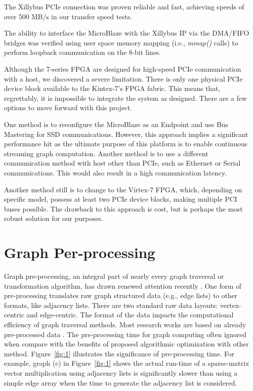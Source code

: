 The Xillybus PCIe connection was proven reliable and fast, achieving speeds of over 500 MB/s in our transfer speed tests.

The ability to interface the MicroBlaze with the Xillybus IP via the DMA/FIFO bridges was verified using user space memory mapping (i.e., \emph{mmap()} calls) to perform loopback communication on the 8-bit lines.

Although the 7-series FPGA are designed for high-speed PCIe communication with a host, we discovered a severe limitation.  There is only one physical PCIe device block available to the Kintex-7's FPGA fabric.  This means that, regrettably, it is impossible to integrate the system as designed.  There are a few options to move forward with this project.  

One method is to reconfigure the MicroBlaze as an Endpoint and use Bus Mastering for SSD communications.  However, this approach implies a significant performance hit as the ultimate purpose of this platform is to enable continuous streaming graph computation.  Another method is to use a different communication method with host other than PCIe, such as Ethernet or Serial communications.  This would also result in a high communication latency.

Another method still is to change to the Virtex-7 FPGA, which, depending on specific model, possess at least two PCIe device blocks, making multiple PCI buses possible.  The drawback to this approach is cost, but is perhaps the most robust solution for our purposes.


\section{Graph Per-processing}
Graph pre-processing, an integral part of nearly every graph traversal or transformation algorithm, has drawn renewed attention recently \cite{malicevic2017everything}. One form of pre-processing translates raw graph structured data (e.g., edge lists) to other formats, like adjacency lists.  There are two standard raw data layouts: vertex-centric and edge-centric.  The format of the data impacts the computational efficiency of graph traversal methods.  Most research works are based on already pre-processed data . The pre-processing time for graph computing often ignored when compare with the benefits of proposed algorithmic optimization with other method. Figure~\ref{fig:1} illustrates the significance of pre-processing time. For example, graph (c) in Figure~\ref{fig:1} shows the actual run-time of a sparse-matrix vector multiplication using adjacency lists is significantly slower than using a simple edge array when the time to generate the adjacency list is considered.



